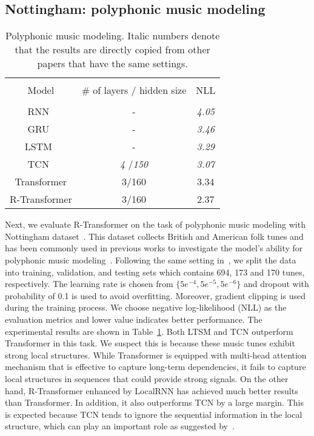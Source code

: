 \documentclass{article} \usepackage{iclr2019_conference,times}
\begin{document}
\subsection{Nottingham: polyphonic music modeling}
\begin{table}
\begin{center}	
		\caption{Polyphonic music modeling. Italic numbers denote that the results are directly copied from other papers that have the same settings.}
		\vspace{4mm}
		\label{table:music}
\begin{tabular}{ccc}
			\hline \\[-0.9ex]
			Model &  \# of layers / hidden size & NLL\\ [0.9ex]	
			\hline			\\[-0.9ex]
			RNN~\citep{bai2018empirical} &  -   &  {\it 4.05} \\ 	[0.5ex]		
			GRU~\citep{bai2018empirical} & - &  {\it 3.46}  \\	[0.5ex]		
			LSTM~\citep{bai2018empirical} &  - & {\it 3.29} \\[0.5ex]
			TCN~\citep{bai2018empirical} &  {\it 4} /{\it 150} &  {\it 3.07} \\[0.5ex]
			Transformer &  3/160   & 3.34\\[0.5ex]
			R-Transformer & 3/160  & 2.37 \\[0.6ex]
			\hline   
		\end{tabular}
	\end{center}
\end{table}
Next, we evaluate R-Transformer on the task of polyphonic music modeling with Nottingham dataset~\citep{boulanger2012modeling}. This dataset collects British and American folk tunes and has been commonly used in previous works to investigate the model's ability for polyphonic music modeling~\citep{boulanger2012modeling,chung2014empirical,bai2018empirical}. Following the same setting in~\citet{bai2018empirical}, we split the data into training, validation, and testing sets which contains 694, 173 and 170 tunes, respectively. The learning rate is chosen from $\{5e^{-4}, 5e^{-5}, 5e^{-6}\}$ and dropout with probability of 0.1 is used to avoid overfitting.  Moreover, gradient clipping is used during the training process. We choose negative log-likelihood (NLL) as the evaluation metrics and lower value indicates better performance. The experimental results are shown in Table~\ref{table:music}. Both LTSM and TCN outperform Transformer in this task. We suspect this is because these music tunes exhibit strong local structures. While Transformer is equipped with multi-head attention mechanism that is effective to capture long-term dependencies, it fails to capture local structures in sequences that could provide strong signals. On the other hand, R-Transformer enhanced by LocalRNN has achieved much better results than Transformer. In addition, it also outperforms TCN by a large margin. This is expected because TCN tends to ignore the sequential information in the local structure, which can play an important role as suggested by~\citep{gehring2017convolutional}.
\end{document}
